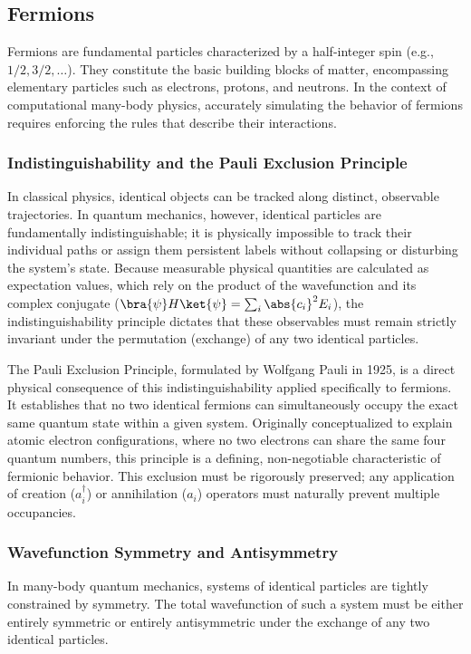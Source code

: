 \subsection{Fermions}
Fermions are fundamental particles characterized by a half-integer spin (e.g., $1/2, 3/2, \dots$). They constitute the basic building blocks of matter, encompassing elementary particles such as electrons, protons, and neutrons. In the context of computational many-body physics, accurately simulating the behavior of fermions requires enforcing the rules that describe their interactions.

\subsubsection{Indistinguishability and the Pauli Exclusion Principle}
In classical physics, identical objects can be tracked along distinct, observable trajectories. In quantum mechanics, however, identical particles are fundamentally indistinguishable; it is physically impossible to track their individual paths or assign them persistent labels without collapsing or disturbing the system's state. Because measurable physical quantities are calculated as expectation values, which rely on the product of the wavefunction and its complex conjugate ($\bra{\psi} H \ket{\psi} = \sum_{i}{\abs{c_i}^2} E_i$), the indistinguishability principle dictates that these observables must remain strictly invariant under the permutation (exchange) of any two identical particles.

The Pauli Exclusion Principle, formulated by Wolfgang Pauli in 1925, is a direct physical consequence of this indistinguishability applied specifically to fermions. It establishes that no two identical fermions can simultaneously occupy the exact same quantum state within a given system. Originally conceptualized to explain atomic electron configurations, where no two electrons can share the same four quantum numbers, this principle is a defining, non-negotiable characteristic of fermionic behavior. This exclusion must be rigorously preserved; any application of creation ($a_i^\dagger$) or annihilation ($a_i$) operators must naturally prevent multiple occupancies.

\subsubsection{Wavefunction Symmetry and Antisymmetry}
In many-body quantum mechanics, systems of identical particles are tightly constrained by symmetry. The total wavefunction of such a system must be either entirely symmetric or entirely antisymmetric under the exchange of any two identical particles.

